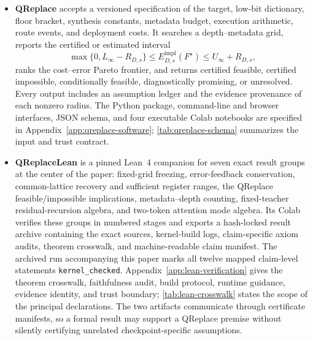 \documentclass[twoside,11pt]{article}
\begin{document}
\begin{itemize}
    \item \textbf{QReplace} accepts a versioned specification of the target,
low-bit dictionary, floor bracket, synthesis constants, metadata budget,
execution arithmetic, route events, and deployment costs.  It searches a
depth--metadata grid, reports the certified or estimated interval
\[
 \max\{0,L_\infty-R_{D,s}\}
 \le E_{D,s}^{\mathrm{impl}}(F^\star)
 \le U_\infty+R_{D,s},
\]
ranks the cost--error Pareto frontier, and returns certified feasible,
certified impossible, conditionally feasible, diagnostically promising, or
unresolved.  Every output includes an assumption ledger and the evidence
provenance of each nonzero radius.  The Python package, command-line and
browser interfaces, JSON schema, and four executable Colab notebooks are
specified in Appendix~\ref{app:qreplace-software}; \cref{tab:qreplace-schema} summarizes the input and trust contract.

    \item \textbf{QReplaceLean} is a pinned Lean~4 companion for seven exact
result groups at the center of the paper: fixed-grid freezing,
error-feedback conservation, common-lattice recovery and sufficient register
ranges, the QReplace feasible/impossible implications, metadata--depth
counting, fixed-teacher residual-recursion algebra, and two-token attention
mode algebra.  Its Colab verifies these groups in numbered stages and exports
a hash-locked result archive containing the exact sources, kernel-build logs,
claim-specific axiom audits, theorem crosswalk, and machine-readable claim
manifest.  The archived run accompanying this paper marks all twelve mapped
claim-level statements \texttt{kernel\_checked}. %
Appendix~\ref{app:lean-verification} gives the theorem crosswalk, faithfulness
audit, build protocol, runtime guidance, evidence identity, and trust boundary;
\cref{tab:lean-crosswalk} states the scope of the principal declarations.
The two artifacts communicate through certificate manifests, so a formal
result may support a QReplace premise without silently certifying unrelated
checkpoint-specific assumptions.
\end{itemize}
\end{document}
